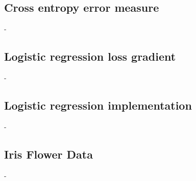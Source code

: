 \subsection{Cross entropy error measure}
-

\subsection{Logistic regression loss gradient}
-

\subsection{Logistic regression implementation}
-

\subsection{Iris Flower Data}
-
